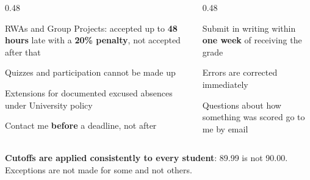 \documentclass[
    10pt,
    dvipsnames,
    svgnames,
    x11names,
    aspectratio=1610,
    english,
    codeminted]{beamer}
\begin{document}
\begin{frame}{\secname}
\medskip
\begin{columns}[T,onlytextwidth]
\begin{column}{0.48\textwidth}
\begin{compactitem}
\footnotesize
    \item RWAs and Group Projects: accepted up to \textbf{48 hours} late with a \textbf{20\% penalty}, not accepted after that
    \item Quizzes and participation cannot be made up
    \item Extensions for documented excused absences under University policy
    \item Contact me \textbf{before} a deadline, not after
\end{compactitem}
\end{column}
\begin{column}{0.48\textwidth}
\begin{compactitem}
\footnotesize
    \item Submit in writing within \textbf{one week} of receiving the grade
    \item Errors are corrected immediately
    \item Questions about how something was scored go to me by email
\end{compactitem}
\end{column}
\end{columns}
\medskip
\begin{MyBox}
\textbf{Cutoffs are applied consistently to every student}: 89.99 is not 90.00. Exceptions are not made for some and not others.
\end{MyBox}
\end{frame}
\endgroup



\end{document}
